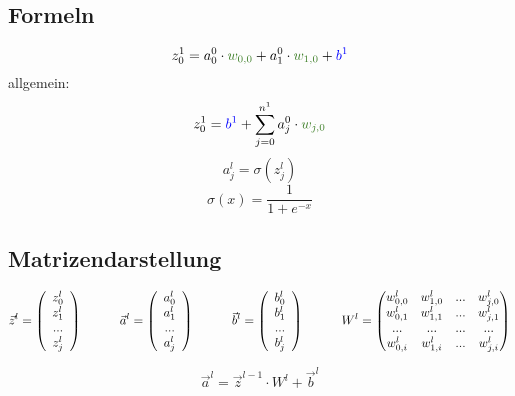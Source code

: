 \documentclass{article}
\begin{document}
\subsection{Formeln}
\[ z_0^1 = a_0^0 \cdot \textcolor{OliveGreen}{w_{0,0}} + a_1^0 \cdot \textcolor{OliveGreen}{w_{1,0}} + \textcolor{blue}{b^1} \]
allgemein:
\[  z_0^1 = \textcolor{blue}{b^1} + \sum_{j=0}^{n^1} a_j^0 \cdot \textcolor{OliveGreen}{w_{j,0}}  \]
\[a_j^l = \sigma(z_j^l)\]
\[\sigma(x) = \frac{1}{1 + e^{-x}}\]


\pagebreak
\subsection{Matrizendarstellung}
\[ \vec{z}^l = \left(\begin{array}{c} z_0^l \\ z_1^l \\ ... \\ z_j^l \end{array}\right) 
\kern 30pt
\vec{a}^l = \left(\begin{array}{c} a_0^l \\ a_1^l \\ ... \\ a_j^l \end{array}\right) 
\kern 30pt
\vec{b}^l = \left(\begin{array}{c} b_0^l \\ b_1^l \\ ... \\ b_j^l \end{array}\right) 
\kern 30pt
W^l = \begin{pmatrix}
    w_{0,0}^l & w_{1,0}^l & ... & w_{j,0}^l \\
    w_{0,1}^l & w_{1,1}^l & ... & w_{j,1}^l \\
    ... & ... & ... & ... \\
    w_{0,i}^l & w_{1,i}^l & ... & w_{j,i}^l
\end{pmatrix} \]

\[ \vec{a}^l = \vec{z}^{l-1} \cdot W^l + \vec{b}^l \]
\end{document}
